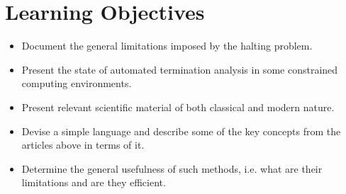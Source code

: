 \section{Learning Objectives}

\begin{itemize}

\item Document the general limitations imposed by the halting problem.

\item Present the state of automated termination analysis in some
constrained computing environments.

\item Present relevant scientific material of both classical and modern nature.

\item Devise a simple language and describe some of the key concepts from the 
articles above in terms of it.

\item Determine the general usefulness of such methods, i.e. what are their 
limitations and are they efficient.

\end{itemize}
